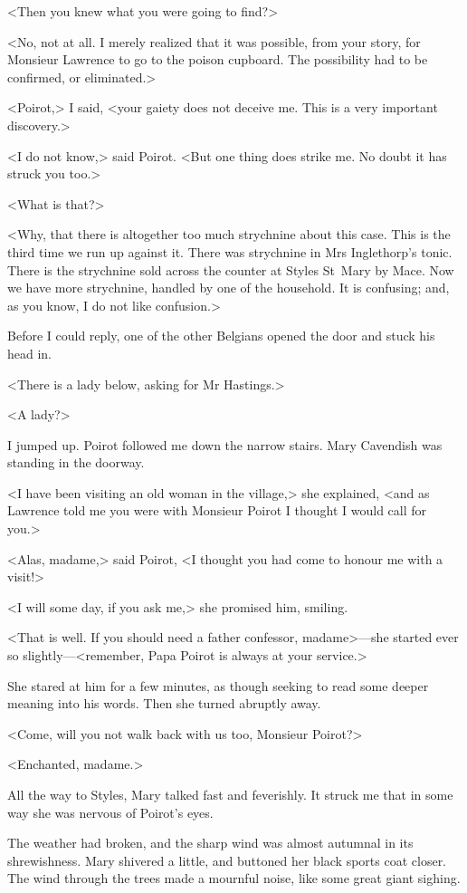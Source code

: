  <Then you knew what you were going to find?> 

 <No, not at all. I merely realized that it was possible, from your story, for Monsieur Lawrence to go to the poison cupboard. The possibility had to be confirmed, or eliminated.> 

 <Poirot,> I said, <your gaiety does not deceive me. This is a very important discovery.> 

 <I do not know,> said Poirot. <But one thing does strike me. No doubt it has struck you too.> 

 <What is that?> 

 <Why, that there is altogether too much strychnine about this case. This is the third time we run up against it. There was strychnine in Mrs Inglethorp's tonic. There is the strychnine sold across the counter at Styles St~Mary by Mace. Now we have more strychnine, handled by one of the household. It is confusing; and, as you know, I do not like confusion.> 

 Before I could reply, one of the other Belgians opened the door and stuck his head in. 

 <There is a lady below, asking for Mr Hastings.> 

 <A lady?> 

 I jumped up. Poirot followed me down the narrow stairs. Mary Cavendish was standing in the doorway. 

 <I have been visiting an old woman in the village,> she explained, <and as Lawrence told me you were with Monsieur Poirot I thought I would call for you.> 

 <Alas, madame,> said Poirot, <I thought you had come to honour me with a visit!> 

 <I will some day, if you ask me,> she promised him, smiling. 

 <That is well. If you should need a father confessor, madame>—she started ever so slightly—<remember, Papa Poirot is always at your service.> 

 She stared at him for a few minutes, as though seeking to read some deeper meaning into his words. Then she turned abruptly away. 

 <Come, will you not walk back with us too, Monsieur Poirot?> 

 <Enchanted, madame.> 

 All the way to Styles, Mary talked fast and feverishly. It struck me that in some way she was nervous of Poirot's eyes. 

 The weather had broken, and the sharp wind was almost autumnal in its shrewishness. Mary shivered a little, and buttoned her black sports coat closer. The wind through the trees made a mournful noise, like some great giant sighing. 

